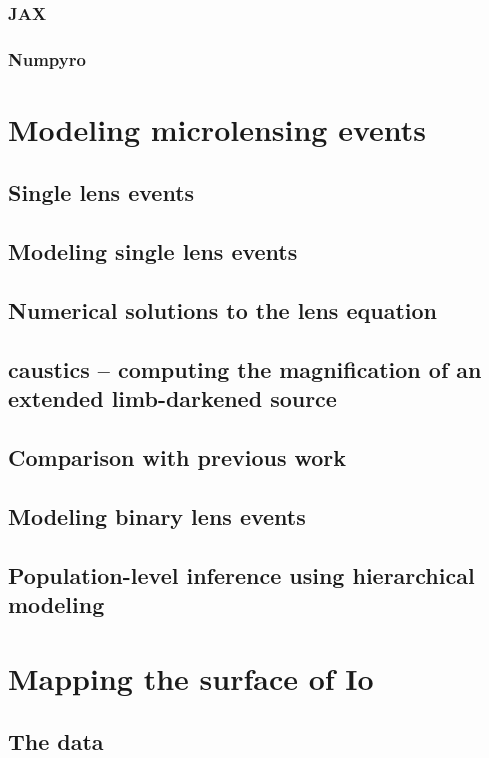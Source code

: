 \documentclass[12pt]{report}
\begin{document}
\subsection{JAX}
\subsection{Numpyro}

\chapter{Modeling microlensing events}
\label{ch:microlensing}
\section{Single lens events}
\section{Modeling single lens events}
\section{Numerical solutions to the lens equation}
\section{\textsf{caustics} -- computing the magnification of an extended limb-darkened source}
\section{Comparison with previous work}
\section{Modeling binary lens events}
\section{Population-level inference using hierarchical modeling}

\chapter{Mapping the surface of Io}
\label{ch:mapping_io}
\section{The data}
\end{document}
